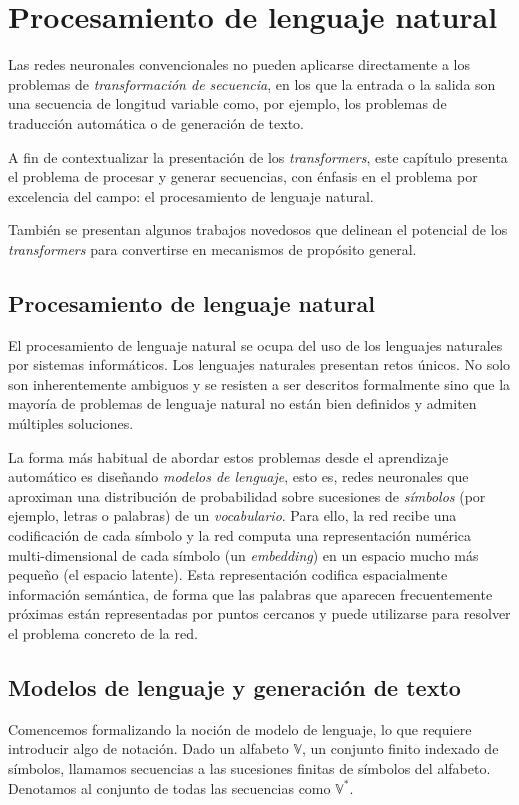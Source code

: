 \chapter{Procesamiento de lenguaje natural}
Las redes neuronales convencionales no pueden aplicarse directamente a los problemas de \textit{transformación de secuencia}, en los que la entrada o la salida son una secuencia de longitud variable como, por ejemplo, los problemas de traducción automática o de generación de texto.

A fin de contextualizar la presentación de los \textit{transformers}, este capítulo presenta el problema de procesar y generar secuencias, con énfasis en el problema por excelencia del campo: el procesamiento de lenguaje natural.

También se presentan algunos trabajos novedosos que delinean el potencial de los \textit{transformers} para convertirse en mecanismos de propósito general.

\section{Procesamiento de lenguaje natural}
El procesamiento de lenguaje natural se ocupa del uso de los lenguajes naturales por sistemas informáticos. Los lenguajes naturales presentan retos únicos. No solo son inherentemente ambiguos y se resisten a ser descritos formalmente sino que la mayoría de problemas de lenguaje natural no están bien definidos y admiten múltiples soluciones. 

La forma más habitual de abordar estos problemas desde el aprendizaje automático es diseñando \textit{modelos de lenguaje}, esto es, redes neuronales que aproximan una distribución de probabilidad sobre sucesiones de \textit{símbolos} (por ejemplo, letras o palabras) de un \textit{vocabulario}. Para ello, la red recibe una codificación de cada símbolo y la red computa una representación numérica multi-dimensional de cada símbolo (un \textit{embedding}) en un espacio mucho más pequeño (el espacio latente). Esta representación codifica espacialmente información semántica, de forma que las palabras que aparecen frecuentemente próximas están representadas por puntos cercanos y puede utilizarse para resolver el problema concreto de la red.

\section{Modelos de lenguaje y generación de texto}
Comencemos formalizando la noción de modelo de lenguaje, lo que requiere introducir algo de notación. Dado un alfabeto \( \mathbb{V} \), un conjunto finito indexado de símbolos, llamamos secuencias a las sucesiones finitas de símbolos del alfabeto. Denotamos al conjunto de todas las secuencias como \( \mathbb{V}^* \).

